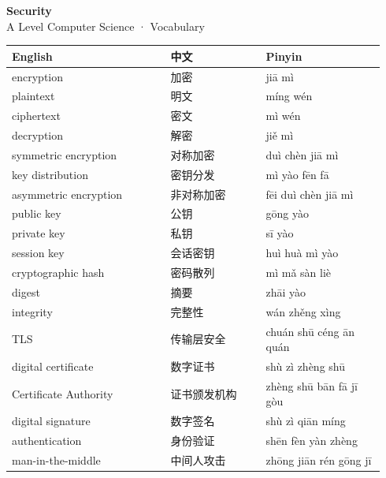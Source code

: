 \documentclass[11pt]{article}
\begin{document}
\begin{center}
  {\LARGE\bfseries Security}\\[0.35em]
  {\large A Level Computer Science · Vocabulary}
\end{center}
\vspace{0.6em}

\begin{longtable}{@{}p{0.40\linewidth}p{0.24\linewidth}p{0.30\linewidth}@{}}
\toprule
\textbf{English} & \textbf{中文} & \textbf{Pinyin} \\
\midrule
\endhead
\bottomrule
\endlastfoot
encryption & 加密 & jiā mì \\
plaintext & 明文 & míng wén \\
ciphertext & 密文 & mì wén \\
decryption & 解密 & jiě mì \\
symmetric encryption & 对称加密 & duì chèn jiā mì \\
key distribution & 密钥分发 & mì yào fēn fā \\
asymmetric encryption & 非对称加密 & fēi duì chèn jiā mì \\
public key & 公钥 & gōng yào \\
private key & 私钥 & sī yào \\
session key & 会话密钥 & huì huà mì yào \\
cryptographic hash & 密码散列 & mì mǎ sàn liè \\
digest & 摘要 & zhāi yào \\
integrity & 完整性 & wán zhěng xìng \\
TLS & 传输层安全 & chuán shū céng ān quán \\
digital certificate & 数字证书 & shù zì zhèng shū \\
Certificate Authority & 证书颁发机构 & zhèng shū bān fā jī gòu \\
digital signature & 数字签名 & shù zì qiān míng \\
authentication & 身份验证 & shēn fèn yàn zhèng \\
man-in-the-middle & 中间人攻击 & zhōng jiān rén gōng jī \\
\end{longtable}
\end{document}
